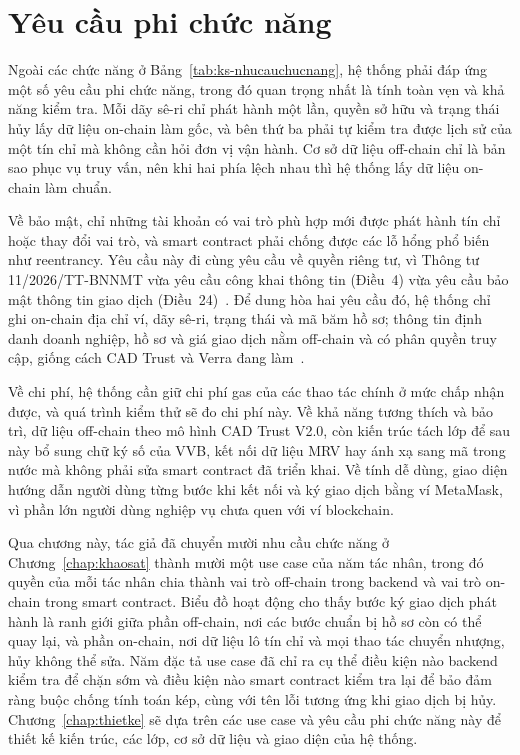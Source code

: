 \section{Yêu cầu phi chức năng}
\label{sec:phichucnang}
\label{subsec:ycphichucnang}

Ngoài các chức năng ở Bảng~\ref{tab:ks-nhucauchucnang}, hệ thống phải đáp ứng một số yêu cầu phi chức năng, trong đó quan trọng nhất là tính toàn vẹn và khả năng kiểm tra. Mỗi dãy sê-ri chỉ phát hành một lần, quyền sở hữu và trạng thái hủy lấy dữ liệu on-chain làm gốc, và bên thứ ba phải tự kiểm tra được lịch sử của một tín chỉ mà không cần hỏi đơn vị vận hành. Cơ sở dữ liệu off-chain chỉ là bản sao phục vụ truy vấn, nên khi hai phía lệch nhau thì hệ thống lấy dữ liệu on-chain làm chuẩn.

Về bảo mật, chỉ những tài khoản có vai trò phù hợp mới được phát hành tín chỉ hoặc thay đổi vai trò, và smart contract phải chống được các lỗ hổng phổ biến như reentrancy. Yêu cầu này đi cùng yêu cầu về quyền riêng tư, vì Thông tư 11/2026/TT-BNNMT vừa yêu cầu công khai thông tin (Điều~4) vừa yêu cầu bảo mật thông tin giao dịch (Điều~24)~\cite{vietnam2026thongtu11}. Để dung hòa hai yêu cầu đó, hệ thống chỉ ghi on-chain địa chỉ ví, dãy sê-ri, trạng thái và mã băm hồ sơ; thông tin định danh doanh nghiệp, hồ sơ và giá giao dịch nằm off-chain và có phân quyền truy cập, giống cách CAD Trust và Verra đang làm~\cite{cadtrust2025datamodel,verra2020registryv2}.

Về chi phí, hệ thống cần giữ chi phí gas của các thao tác chính ở mức chấp nhận được, và quá trình kiểm thử sẽ đo chi phí này. Về khả năng tương thích và bảo trì, dữ liệu off-chain theo mô hình CAD Trust V2.0, còn kiến trúc tách lớp để sau này bổ sung chữ ký số của VVB, kết nối dữ liệu MRV hay ánh xạ sang mã trong nước mà không phải sửa smart contract đã triển khai. Về tính dễ dùng, giao diện hướng dẫn người dùng từng bước khi kết nối và ký giao dịch bằng ví MetaMask, vì phần lớn người dùng nghiệp vụ chưa quen với ví blockchain.

Qua chương này, tác giả đã chuyển mười nhu cầu chức năng ở Chương~\ref{chap:khaosat} thành mười một use case của năm tác nhân, trong đó quyền của mỗi tác nhân chia thành vai trò off-chain trong backend và vai trò on-chain trong smart contract. Biểu đồ hoạt động cho thấy bước ký giao dịch phát hành là ranh giới giữa phần off-chain, nơi các bước chuẩn bị hồ sơ còn có thể quay lại, và phần on-chain, nơi dữ liệu lô tín chỉ và mọi thao tác chuyển nhượng, hủy không thể sửa. Năm đặc tả use case đã chỉ ra cụ thể điều kiện nào backend kiểm tra để chặn sớm và điều kiện nào smart contract kiểm tra lại để bảo đảm ràng buộc chống tính toán kép, cùng với tên lỗi tương ứng khi giao dịch bị hủy. Chương~\ref{chap:thietke} sẽ dựa trên các use case và yêu cầu phi chức năng này để thiết kế kiến trúc, các lớp, cơ sở dữ liệu và giao diện của hệ thống.
